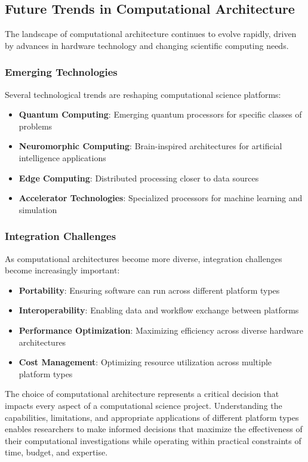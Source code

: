 \subsection{Future Trends in Computational Architecture}

The landscape of computational architecture continues to evolve rapidly, driven by advances in hardware technology and changing scientific computing needs.

\subsubsection{Emerging Technologies}

Several technological trends are reshaping computational science platforms:

\begin{itemize}
    \item \textbf{Quantum Computing}: Emerging quantum processors for specific classes of problems
    \item \textbf{Neuromorphic Computing}: Brain-inspired architectures for artificial intelligence applications
    \item \textbf{Edge Computing}: Distributed processing closer to data sources
    \item \textbf{Accelerator Technologies}: Specialized processors for machine learning and simulation
\end{itemize}

\subsubsection{Integration Challenges}

As computational architectures become more diverse, integration challenges become increasingly important:

\begin{itemize}
    \item \textbf{Portability}: Ensuring software can run across different platform types
    \item \textbf{Interoperability}: Enabling data and workflow exchange between platforms
    \item \textbf{Performance Optimization}: Maximizing efficiency across diverse hardware architectures
    \item \textbf{Cost Management}: Optimizing resource utilization across multiple platform types
\end{itemize}

The choice of computational architecture represents a critical decision that impacts every aspect of a computational science project. Understanding the capabilities, limitations, and appropriate applications of different platform types enables researchers to make informed decisions that maximize the effectiveness of their computational investigations while operating within practical constraints of time, budget, and expertise.


